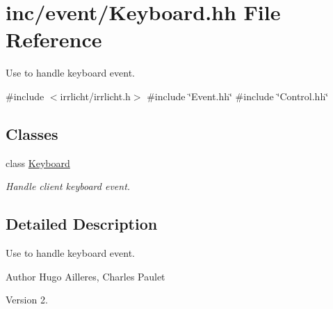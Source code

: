 \hypertarget{Keyboard_8hh}{}\section{inc/event/\+Keyboard.hh File Reference}
\label{Keyboard_8hh}


Use to handle keyboard event.  


{\ttfamily \#include $<$irrlicht/irrlicht.\+h$>$}\newline
{\ttfamily \#include \char`\"{}Event.\+hh\char`\"{}}\newline
{\ttfamily \#include \char`\"{}Control.\+hh\char`\"{}}\newline
\subsection*{Classes}
\begin{DoxyCompactItemize}
\item 
class \hyperlink{classKeyboard}{Keyboard}
\begin{DoxyCompactList}\small\item\em Handle client keyboard event. \end{DoxyCompactList}\end{DoxyCompactItemize}


\subsection{Detailed Description}
Use to handle keyboard event. 

\begin{DoxyAuthor}{Author}
Hugo Ailleres, Charles Paulet 
\end{DoxyAuthor}
\begin{DoxyVersion}{Version}
2. 
\end{DoxyVersion}
